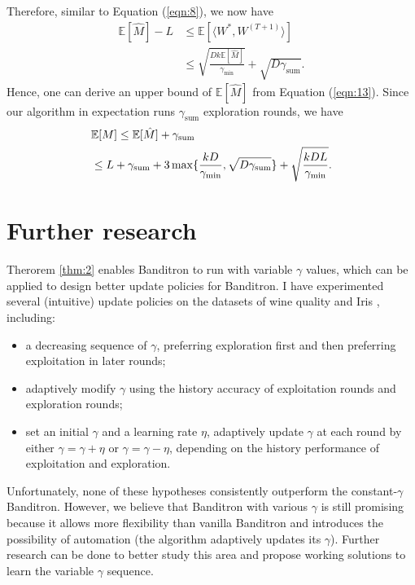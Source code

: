 \documentclass{article}
\begin{document}
Therefore, similar to Equation (\ref{eqn:8}), we now have
\begin{equation}\label{eqn:13}
    \begin{aligned}
    \mathbb{E}[\hat{M}]-L&\leq\mathbb{E}[\langle W^*,W^{(T+1)}\rangle]\\
    &\leq\sqrt{\frac{Dk\mathbb{E}[\hat{M}]}{\gamma_{\min}}}+\sqrt{D\gamma_{\text{sum}}}.
    \end{aligned}
\end{equation}
Hence, one can derive an upper bound of $\mathbb{E}[\hat{M}]$ from Equation (\ref{eqn:13}). Since our algorithm in expectation runs $\gamma_{\text{sum}}$ exploration rounds, we have
\begin{equation}
    \begin{aligned}
    &\mathbb{E}[M]\leq \mathbb{E}[\hat{M}]+\gamma_{\text{sum}}\\
    &\leq L+\gamma_{\textup{sum}}+3\max\{\frac{kD}{\gamma_{\min}},\sqrt{D\gamma_{\textup{sum}}}\}+\sqrt{\frac{kDL}{\gamma_{\min}}}.
    \end{aligned}
\end{equation}

\section{Further research}
Therorem \ref{thm:2} enables Banditron to run with variable $\gamma$ values, which can be applied to design better update policies for Banditron. I have experimented several (intuitive) update policies on the datasets of wine quality and Iris \cite{wine1999,iris2019}, including:
\begin{itemize}
    \item a decreasing sequence of $\gamma$, preferring exploration first and then preferring exploitation in later rounds;
    \item adaptively modify $\gamma$ using the history accuracy of exploitation rounds and exploration rounds;
    \item set an initial $\gamma$ and a learning rate $\eta$, adaptively update $\gamma$ at each round by either $\gamma=\gamma+\eta$ or $\gamma=\gamma-\eta$, depending on the history performance of exploitation and exploration.
\end{itemize}

Unfortunately, none of these hypotheses consistently outperform the constant-$\gamma$ Banditron. However, we believe that Banditron with various $\gamma$ is still promising because it allows more flexibility than vanilla Banditron and introduces the possibility of automation (the algorithm adaptively updates its $\gamma$). Further research can be done to better study this area and propose working solutions to learn the variable $\gamma$ sequence.
\end{document}
